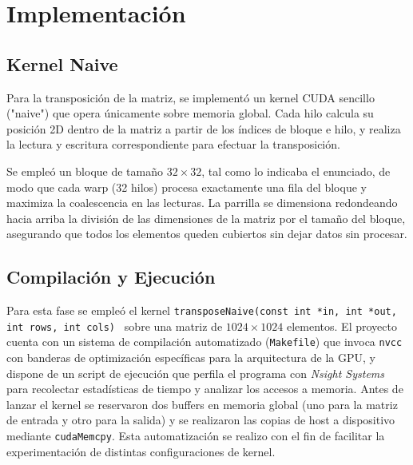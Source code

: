 \documentclass[a4paper,11pt]{article}
\begin{document}
\section{Implementación}
\subsection{Kernel Naive}
Para la transposición de la matriz, se implementó un kernel CUDA sencillo ("naive") que opera únicamente sobre memoria global. Cada hilo calcula su posición 2D dentro de la matriz a partir de los índices de bloque e hilo, y realiza la lectura y escritura correspondiente para efectuar la transposición.

Se empleó un bloque de tamaño $32\times32$, tal como lo indicaba el enunciado, de modo que cada warp (32 hilos) procesa exactamente una fila del bloque y maximiza la coalescencia en las lecturas. La parrilla se dimensiona redondeando hacia arriba la división de las dimensiones de la matriz por el tamaño del bloque, asegurando que todos los elementos queden cubiertos sin dejar datos sin procesar.


\subsection{Compilación y Ejecución}
Para esta fase se empleó el kernel \texttt{transposeNaive(const int *in, int *out, int rows, int cols)
} sobre una matriz de \(1024\times1024\) elementos. El proyecto cuenta con un sistema de compilación automatizado (\texttt{Makefile}) que invoca \texttt{nvcc} con banderas de optimización específicas para la arquitectura de la GPU, y dispone de un script de ejecución que perfila el programa con \textit{Nsight Systems} para recolectar estadísticas de tiempo y analizar los accesos a memoria. Antes de lanzar el kernel se reservaron dos buffers en memoria global (uno para la matriz de entrada y otro para la salida) y se realizaron las copias de host a dispositivo mediante \texttt{cudaMemcpy}. Esta automatización se realizo con el fin de facilitar la experimentación de distintas configuraciones de kernel.
\end{document}
